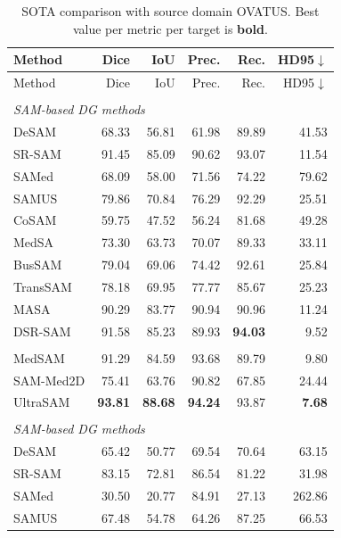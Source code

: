 \documentclass[10pt]{article}
\begin{document}
{\small
\begin{longtable}{lrrrrr}
\caption{SOTA comparison with source domain OVATUS. Best value per metric per target is \textbf{bold}.}
\label{tab:sota_ovatus}\\
\toprule
Method & Dice & IoU & Prec. & Rec. & HD95$\downarrow$ \\
\midrule
\endfirsthead
\toprule
Method & Dice & IoU & Prec. & Rec. & HD95$\downarrow$ \\
\midrule
\endhead
\endfoot
\bottomrule
\endlastfoot
\multicolumn{6}{l}{\textit{Target: OTU}} \\
\midrule
\multicolumn{6}{l}{\textit{SAM-based DG methods}} \\
DeSAM & 68.33 & 56.81 & 61.98 & 89.89 & 41.53 \\
SR-SAM & 91.45 & 85.09 & 90.62 & 93.07 & 11.54 \\
SAMed & 68.09 & 58.00 & 71.56 & 74.22 & 79.62 \\
SAMUS & 79.86 & 70.84 & 76.29 & 92.29 & 25.51 \\
CoSAM & 59.75 & 47.52 & 56.24 & 81.68 & 49.28 \\
MedSA & 73.30 & 63.73 & 70.07 & 89.33 & 33.11 \\
BusSAM & 79.04 & 69.06 & 74.42 & 92.61 & 25.84 \\
TransSAM & 78.18 & 69.95 & 77.77 & 85.67 & 25.23 \\
MASA & 90.29 & 83.77 & 90.94 & 90.96 & 11.24 \\
DSR-SAM & 91.58 & 85.23 & 89.93 & \textbf{94.03} & 9.52 \\
\addlinespace[2pt]
\multicolumn{6}{l}{\textit{Zero-shot foundation models}} \\
MedSAM & 91.29 & 84.59 & 93.68 & 89.79 & 9.80 \\
SAM-Med2D & 75.41 & 63.76 & 90.82 & 67.85 & 24.44 \\
UltraSAM & \textbf{93.81} & \textbf{88.68} & \textbf{94.24} & 93.87 & \textbf{7.68} \\
\addlinespace[4pt]
\multicolumn{6}{l}{\textit{Target: USOVA}} \\
\midrule
\multicolumn{6}{l}{\textit{SAM-based DG methods}} \\
DeSAM & 65.42 & 50.77 & 69.54 & 70.64 & 63.15 \\
SR-SAM & 83.15 & 72.81 & 86.54 & 81.22 & 31.98 \\
SAMed & 30.50 & 20.77 & 84.91 & 27.13 & 262.86 \\
SAMUS & 67.48 & 54.78 & 64.26 & 87.25 & 66.53 \\

\end{longtable}}
\end{document}
